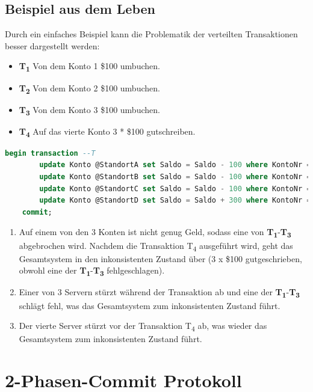 \documentclass[11pt]{scrartcl}       %
\begin{document}
\subsection{Beispiel aus dem Leben}

Durch ein einfaches Beispiel kann die Problematik der 
verteilten Transaktionen besser dargestellt werden: 

\begin{itemize}
	\item
	\textbf{T\textsubscript{1}} Von dem Konto 1 \$100 umbuchen.
	\item
	\textbf{T\textsubscript{2}} Von dem Konto 2 \$100 umbuchen.
	\item
	\textbf{T\textsubscript{3}} Von dem Konto 3 \$100 umbuchen. 
	\item 
	\textbf{T\textsubscript{4}} Auf das vierte Konto 3 * \$100 gutschreiben. 
\end{itemize}

\begin{lstlisting}[language=SQL, caption=Transaktion als SQL dargestellt]
	begin transaction --T
		update Konto @StandortA set Saldo = Saldo - 100 where KontoNr = 1; --T1
		update Konto @StandortB set Saldo = Saldo - 100 where KontoNr = 2; --T2
		update Konto @StandortC set Saldo = Saldo - 100 where KontoNr = 3; --T3
		update Konto @StandortD set Saldo = Saldo + 300 where KontoNr = 4; --T4
	commit;
\end{lstlisting}

\begin{enumerate}
	\item Auf einem von den 3 Konten ist nicht genug Geld, sodass eine von \textbf{T\textsubscript{1}}-\textbf{T\textsubscript{3}} abgebrochen wird. Nachdem die  Transaktion T\textsubscript{4} ausgeführt wird, geht das Gesamtsystem in den inkonsistenten Zustand über (3 x \$100 gutgeschrieben, obwohl eine der \textbf{T\textsubscript{1}}-\textbf{T\textsubscript{3}} fehlgeschlagen). 
	\item Einer von 3 Servern stürzt während der Transaktion ab und eine der \textbf{T\textsubscript{1}}-\textbf{T\textsubscript{3}} schlägt fehl, was das Gesamtsystem zum inkonsistenten Zustand führt.
	\item Der vierte Server stürzt vor der Transaktion T\textsubscript{4} ab, was wieder das Gesamtsystem zum inkonsistenten Zustand führt. \cite{database_systems}
\end{enumerate}

\section{2-Phasen-Commit Protokoll}\label{sec:kapitel3}
\end{document}
